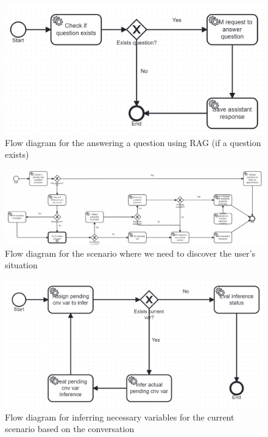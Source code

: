 \documentclass[a4paper,12pt,twoside]{ThesisStyle}
\begin{document}
\begin{figure}[H]
  \centering
  \includegraphics[width=1\textwidth]{imatges/Answer_question_if_exists.bpmn20.png}
  \caption{Flow diagram for the answering a question using RAG (if a question exists)}
  \label{fig:answerragquestionifexists}
\end{figure}

\begin{figure}[H]
  \centering
  \includegraphics[width=1\textwidth]{imatges/Situation_discovery_scenario.bpmn20.png}
  \caption{Flow diagram for the scenario where we need to discover the user's situation}
  \label{fig:executesituationdiscoveryscenario}
\end{figure}

\begin{figure}[H]
  \centering
  \includegraphics[width=1\textwidth]{imatges/Infere_conversation_variables.bpmn20.png}
  \caption{Flow diagram for inferring necessary variables for the current scenario based on the conversation}
  \label{fig:infervariablesprocess}
\end{figure}
\end{document}
